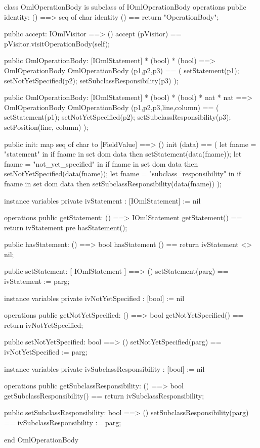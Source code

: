 \begin{vdm_al}
class OmlOperationBody is subclass of IOmlOperationBody
operations
  public identity: () ==> seq of char
  identity () == return "OperationBody";

  public accept: IOmlVisitor ==> ()
  accept (pVisitor) == pVisitor.visitOperationBody(self);

  public OmlOperationBody:
    [IOmlStatement] *
    (bool) *
    (bool) ==> OmlOperationBody
  OmlOperationBody (p1,p2,p3) == 
    ( setStatement(p1);
      setNotYetSpecified(p2);
      setSubclassResponsibility(p3) );

  public OmlOperationBody:
    [IOmlStatement] *
    (bool) *
    (bool) *
    nat *
    nat ==> OmlOperationBody
  OmlOperationBody (p1,p2,p3,line,column) == 
    ( setStatement(p1);
      setNotYetSpecified(p2);
      setSubclassResponsibility(p3);
      setPosition(line, column) );

  public init: map seq of char to [FieldValue] ==> ()
  init (data) ==
    ( let fname = "statement" in
        if fname in set dom data
        then setStatement(data(fname));
      let fname = "not_yet_specified" in
        if fname in set dom data
        then setNotYetSpecified(data(fname));
      let fname = "subclass_responsibility" in
        if fname in set dom data
        then setSubclassResponsibility(data(fname)) );

instance variables
  private ivStatement : [IOmlStatement] := nil

operations
  public getStatement: () ==> IOmlStatement
  getStatement() == return ivStatement
    pre hasStatement();

  public hasStatement: () ==> bool
  hasStatement () == return ivStatement <> nil;

  public setStatement: [ IOmlStatement ] ==> ()
  setStatement(parg) == ivStatement := parg;

instance variables
  private ivNotYetSpecified : [bool] := nil

operations
  public getNotYetSpecified: () ==> bool
  getNotYetSpecified() == return ivNotYetSpecified;

  public setNotYetSpecified: bool ==> ()
  setNotYetSpecified(parg) == ivNotYetSpecified := parg;

instance variables
  private ivSubclassResponsibility : [bool] := nil

operations
  public getSubclassResponsibility: () ==> bool
  getSubclassResponsibility() == return ivSubclassResponsibility;

  public setSubclassResponsibility: bool ==> ()
  setSubclassResponsibility(parg) == ivSubclassResponsibility := parg;

end OmlOperationBody
\end{vdm_al}

